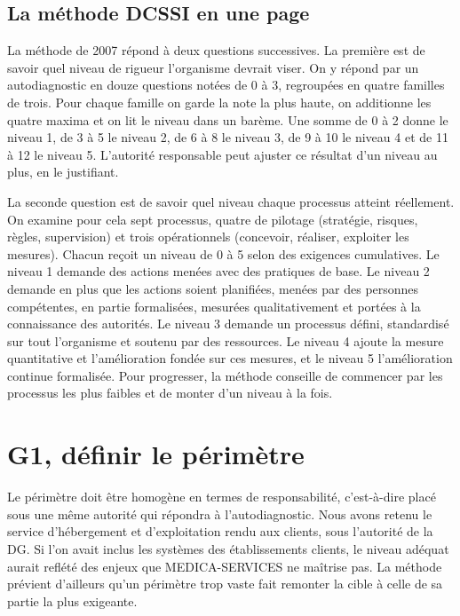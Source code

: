 \documentclass[11pt,a4paper]{article}
\begin{document}
\subsection{La méthode DCSSI en une page}

La méthode de 2007 répond à deux questions successives. La première est de savoir quel niveau de rigueur l'organisme devrait viser. On y répond par un autodiagnostic en douze questions notées de 0 à 3, regroupées en quatre familles de trois. Pour chaque famille on garde la note la plus haute, on additionne les quatre maxima et on lit le niveau dans un barème. Une somme de 0 à 2 donne le niveau 1, de 3 à 5 le niveau 2, de 6 à 8 le niveau 3, de 9 à 10 le niveau 4 et de 11 à 12 le niveau 5. L'autorité responsable peut ajuster ce résultat d'un niveau au plus, en le justifiant.

La seconde question est de savoir quel niveau chaque processus atteint réellement. On examine pour cela sept processus, quatre de pilotage (stratégie, risques, règles, supervision) et trois opérationnels (concevoir, réaliser, exploiter les mesures). Chacun reçoit un niveau de 0 à 5 selon des exigences cumulatives. Le niveau 1 demande des actions menées avec des pratiques de base. Le niveau 2 demande en plus que les actions soient planifiées, menées par des personnes compétentes, en partie formalisées, mesurées qualitativement et portées à la connaissance des autorités. Le niveau 3 demande un processus défini, standardisé sur tout l'organisme et soutenu par des ressources. Le niveau 4 ajoute la mesure quantitative et l'amélioration fondée sur ces mesures, et le niveau 5 l'amélioration continue formalisée. Pour progresser, la méthode conseille de commencer par les processus les plus faibles et de monter d'un niveau à la fois.


\section{G1, définir le périmètre}

Le périmètre doit être homogène en termes de responsabilité, c'est-à-dire placé sous une même autorité qui répondra à l'autodiagnostic. Nous avons retenu le service d'hébergement et d'exploitation rendu aux clients, sous l'autorité de la DG. Si l'on avait inclus les systèmes des établissements clients, le niveau adéquat aurait reflété des enjeux que MEDICA-SERVICES ne maîtrise pas. La méthode prévient d'ailleurs qu'un périmètre trop vaste fait remonter la cible à celle de sa partie la plus exigeante.
\end{document}
